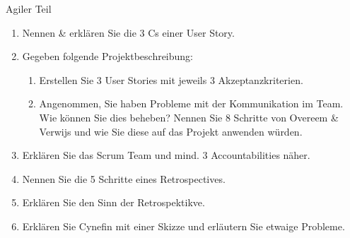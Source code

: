 \documentclass{article}
\begin{document}
\begin{exercise}{Agiler Teil}
  \begin{enumerate}
    \item Nennen \& erklären Sie die 3 Cs einer User Story.
    \item Gegeben folgende Projektbeschreibung:

          \begin{enumerate}
            \item Erstellen Sie 3 User Stories mit jeweils 3 Akzeptanzkriterien.
            \item Angenommen, Sie haben Probleme mit der Kommunikation im Team. Wie können Sie dies beheben? Nennen Sie 8 Schritte von Overeem \& Verwijs und wie Sie diese auf das Projekt anwenden würden.
          \end{enumerate}
    \item Erklären Sie das Scrum Team und mind. 3 Accountabilities näher.
    \item Nennen Sie die 5 Schritte eines Retrospectives.
    \item Erklären Sie den Sinn der Retrospektikve.
    \item Erklären Sie Cynefin mit einer Skizze und erläutern Sie etwaige Probleme.
  \end{enumerate}


\end{exercise}
\end{document}
